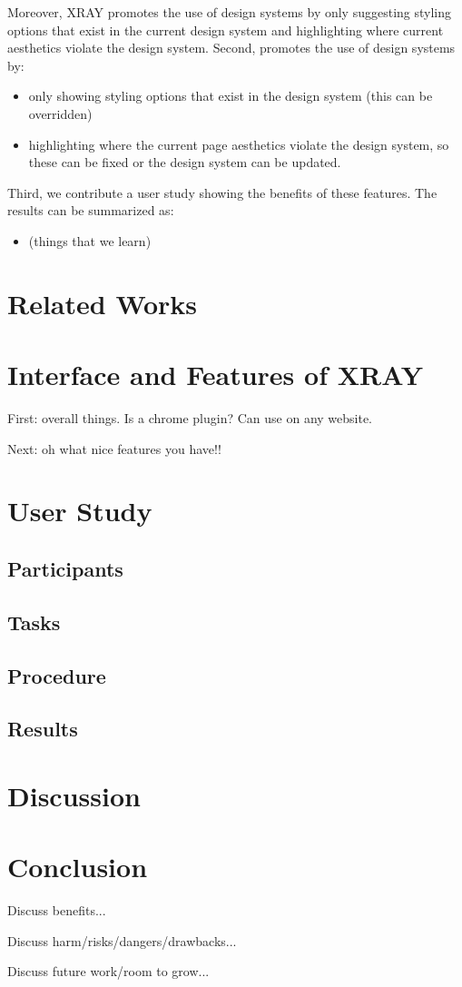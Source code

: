 \documentclass{sigchi-ext}
\begin{document}
Moreover, XRAY promotes the use of design systems by only suggesting styling options that exist in the current design system and highlighting where current aesthetics violate the design system. 
Second, promotes the use of design systems by: 
\begin{itemize}
    \item only showing styling options that exist in the design system (this can be overridden) 
    \item highlighting where the current page aesthetics violate the design system, so these can be fixed or the design system can be updated.
\end{itemize}{}

Third, we contribute a user study showing the benefits of these features. The results can be summarized as: 
\begin{itemize}
    \item (things that we learn)
\end{itemize}

\section{Related Works}

\section{Interface and Features of XRAY}
First: overall things. Is a chrome plugin? Can use on any website. 

Next: oh what nice features you have!!
\section{User Study}
\subsection{Participants}
\subsection{Tasks}
\subsection{Procedure}
\subsection{Results}


\section{Discussion}

\section{Conclusion}
Discuss benefits...

Discuss harm/risks/dangers/drawbacks...

Discuss future work/room to grow...










\balance{} 



\end{document}
